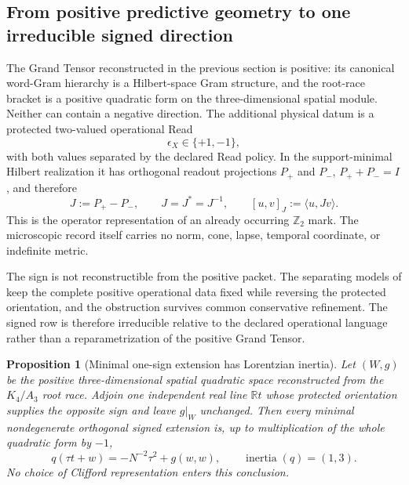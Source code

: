 \documentclass[11pt]{article}
\newtheorem{proposition}[proposition]{Proposition}
\theoremstyle{definition}
\theoremstyle{remark}
\newcommand{\R}{\mathbb R}
\begin{document}
\subsection{From positive predictive geometry to one irreducible signed direction}

The Grand Tensor reconstructed in the previous section is positive: its
canonical word-Gram hierarchy is a Hilbert-space Gram structure, and the
root-race bracket is a positive quadratic form on the three-dimensional
spatial module.  Neither can contain a negative direction.  The additional
physical datum is a protected two-valued operational Read
\begin{equation}
 \epsilon_X\in\{+1,-1\},
 \label{eq:orientation-read-main}
\end{equation}
with both values separated by the declared Read policy.  In the support-minimal
Hilbert realization it has orthogonal readout projections $P_+$ and $P_-$,
$P_++P_-=I$, and therefore
\begin{equation}
 \boxed{J:=P_+-P_-,\qquad J=J^*=J^{-1},}
 \qquad [u,v]_J:=\langle u,Jv\rangle.
 \label{eq:krein-main}
\end{equation}
This is the operator representation of an already occurring $\mathbb Z_2$
mark.  The microscopic record itself carries no norm, cone, lapse, temporal
coordinate, or indefinite metric.

The sign is not reconstructible from the positive packet.  The separating
models of  keep the complete positive
operational data fixed while reversing the protected orientation, and the
obstruction survives common conservative refinement.  The signed row is
therefore irreducible relative to the declared operational language rather than
a reparametrization of the positive Grand Tensor.

\begin{proposition}[Minimal one-sign extension has Lorentzian inertia]
\label{prop:main-signature-minimality}
Let $(W,g)$ be the positive three-dimensional spatial quadratic space
reconstructed from the $K_4/A_3$ root race.  Adjoin one independent real line
$\R t$ whose protected orientation supplies the opposite sign and leave
$g|_W$ unchanged.  Then every minimal nondegenerate orthogonal signed extension
is, up to multiplication of the whole quadratic form by $-1$,
\begin{equation}
 \boxed{q(\tau t+w)=-N^{-2}\tau^2+g(w,w),
 \qquad \operatorname{inertia}(q)=(1,3).}
 \label{eq:main-signature-inertia}
\end{equation}
No choice of Clifford representation enters this conclusion.
\end{proposition}
\end{document}
